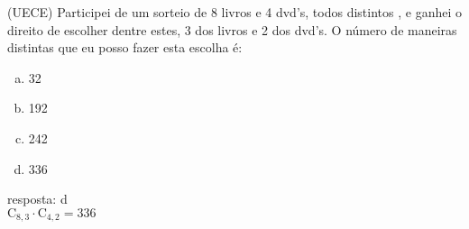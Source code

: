 \begin{ex}
(UECE) Participei de um sorteio de 8 livros e 4 dvd's,  todos distintos , e ganhei o direito de escolher dentre estes, 3 dos livros e 2 dos dvd's. O número de maneiras distintas que eu posso fazer esta escolha é:
    \begin{enumerate}[(a)]
    \item 32
    \item 192
    \item 242
    \item 336
    \end{enumerate}
      \begin{sol}
      resposta: d  \\
     $\mathrm{C}_{8,3}\cdot\mathrm{C}_{4,2}= 336$ 
      \end{sol}
\end{ex}